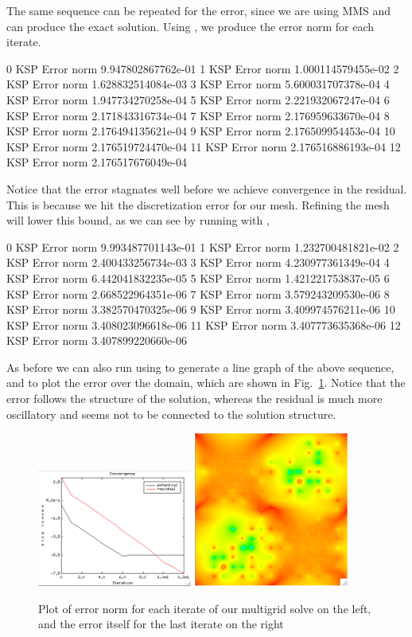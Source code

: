 The same sequence can be repeated for the error, since we are using MMS and can produce the exact solution. Using , we produce the error norm for each iterate.
\begin{bash}
0 KSP Error norm 9.947802867762e-01
1 KSP Error norm 1.000114579455e-02
2 KSP Error norm 1.628832514084e-03
3 KSP Error norm 5.600031707378e-04
4 KSP Error norm 1.947734270258e-04
5 KSP Error norm 2.221932067247e-04
6 KSP Error norm 2.171843316734e-04
7 KSP Error norm 2.176959633670e-04
8 KSP Error norm 2.176494135621e-04
9 KSP Error norm 2.176509954453e-04
10 KSP Error norm 2.176519724470e-04
11 KSP Error norm 2.176516886193e-04
12 KSP Error norm 2.176517676049e-04
\end{bash}
Notice that the error stagnates well before we achieve convergence in the residual. This is because we hit the discretization error for our mesh. Refining the mesh will lower this bound, as we can see by running with ,
\begin{bash}
0 KSP Error norm 9.993487701143e-01
1 KSP Error norm 1.232700481821e-02
2 KSP Error norm 2.400433256734e-03
3 KSP Error norm 4.230977361349e-04
4 KSP Error norm 6.442041832235e-05
5 KSP Error norm 1.421221753837e-05
6 KSP Error norm 2.668522964351e-06
7 KSP Error norm 3.579243209530e-06
8 KSP Error norm 3.382570470325e-06
9 KSP Error norm 3.409974576211e-06
10 KSP Error norm 3.408023096618e-06
11 KSP Error norm 3.407773635368e-06
12 KSP Error norm 3.407899220660e-06
\end{bash}
As before we can also run using  to generate a line graph of the above sequence, and  to plot the error over the domain, which are shown in Fig.~\ref{fig:errorPlots}. Notice that the error follows the structure of the solution, whereas the residual is much more oscillatory and seems not to be connected to the solution structure.

\begin{figure}
\centering
\includegraphics[width=2in]{figures/errorLG.png}\hfil
\includegraphics[width=2in]{figures/errorLast.png}
\caption{Plot of error norm for each iterate of our multigrid solve on the left, and the error itself for the last iterate on the right\label{fig:errorPlots}}
\end{figure}
